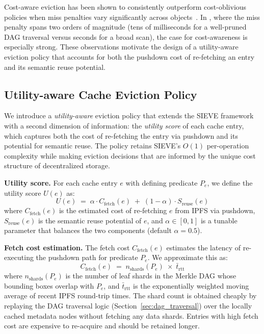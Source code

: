 Cost-aware eviction has been shown to consistently outperform cost-oblivious policies when miss penalties vary significantly across objects~\cite{podlipnig2003survey}.
In \ours{}, where the miss penalty spans two orders of magnitude (tens of milliseconds for a well-pruned DAG traversal versus seconds for a broad scan), the case for cost-awareness is especially strong.
These observations motivate the design of a utility-aware eviction policy that accounts for both the pushdown cost of re-fetching an entry and its semantic reuse potential.

\subsection{\ours{} Utility-aware Cache Eviction Policy}
\label{sec:utility_aware}

We introduce a \emph{utility-aware} eviction policy that extends the SIEVE framework~\cite{zhang2024sieve} with a second dimension of information: the \emph{utility score} of each cache entry, which captures both the cost of re-fetching the entry via pushdown and its potential for semantic reuse.
The policy retains SIEVE's $O(1)$ per-operation complexity while making eviction decisions that are informed by the unique cost structure of decentralized storage.

\textbf{Utility score.}
For each cache entry $e$ with defining predicate $P_e$, we define the utility score $U(e)$ as:
\begin{equation}
    U(e) \;=\; \alpha \cdot C_{\text{fetch}}(e) \;+\; (1-\alpha) \cdot S_{\text{reuse}}(e)
    \label{eq:utility}
\end{equation}
where $C_{\text{fetch}}(e)$ is the estimated cost of re-fetching $e$ from IPFS via pushdown, $S_{\text{reuse}}(e)$ is the semantic reuse potential of $e$, and $\alpha \in [0,1]$ is a tunable parameter that balances the two components (default $\alpha = 0.5$).

\textbf{Fetch cost estimation.}
The fetch cost $C_{\text{fetch}}(e)$ estimates the latency of re-executing the pushdown path for predicate $P_e$.
We approximate this as:
\begin{equation}
    C_{\text{fetch}}(e) \;=\; n_{\text{shards}}(P_e) \;\times\; \bar{t}_{\text{rtt}}
    \label{eq:fetch_cost}
\end{equation}
where $n_{\text{shards}}(P_e)$ is the number of leaf shards in the Merkle DAG whose bounding boxes overlap with $P_e$, and $\bar{t}_{\text{rtt}}$ is the exponentially weighted moving average of recent IPFS round-trip times.
The shard count is obtained cheaply by replaying the DAG traversal logic (Section~\ref{sec:dag_traversal}) over the locally cached metadata nodes without fetching any data shards.
Entries with high fetch cost are expensive to re-acquire and should be retained longer.

